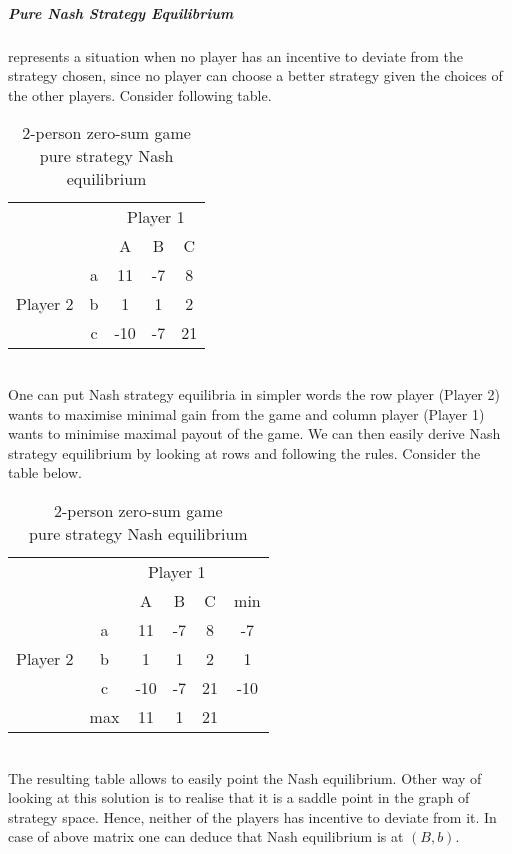\documentclass[10pt, a4paper]{report}
\begin{document}
\subparagraph{Pure Nash Strategy Equilibrium} represents a situation when no player has an incentive to deviate from the strategy chosen, since no player can choose a better strategy given the choices of the other players. Consider following table.
\begin{table}[ht!]
	\hspace{-4em}
	\centering
	\begin{tabular}{ccccc|}
		& & \multicolumn{3}{c}{Player 1}                                  \\ \cline{3-5}
		& & A & B & \multicolumn{1}{c}{C}                                 \\ \cline{3-5}
		\multirow{3}{*}{Player 2} & \multicolumn{1}{|c|}{a} & 11 & -7 & 8 \\
		& \multicolumn{1}{|c|}{b} & 1 & 1 & 2                             \\
		& \multicolumn{1}{|c|}{c} & -10 & -7 & 21                         \\ \cline{3-5}
	\end{tabular}
	\caption{2-person zero-sum game\\ pure strategy Nash equilibrium}
\end{table}
\\
One can put Nash strategy equilibria in simpler words the row player (Player 2) wants to maximise minimal gain from the game and column player (Player 1) wants to minimise maximal payout of the game. We can then easily derive Nash strategy equilibrium by looking at rows and following the rules. Consider the table below.
\begin{table}[ht!]
	\hspace{-4em}
	\centering
	\begin{tabular}{ccccc|c}
		& & \multicolumn{3}{c}{Player 1} &                                     \\ \cline{3-5}
		& & A & B & \multicolumn{1}{c}{C} & min                                \\ \cline{3-5}
		\multirow{3}{*}{Player 2} & \multicolumn{1}{|c|}{a} & 11 & -7 & 8 & -7 \\
		& \multicolumn{1}{|c|}{b} & 1 & 1 & 2 & 1                              \\
		& \multicolumn{1}{|c|}{c} & -10 & -7 & 21 & -10                        \\ \cline{3-5}
		& max & 11 & 1 & \multicolumn{1}{c}{21} &
	\end{tabular}
	\caption{2-person zero-sum game\\ pure strategy Nash equilibrium}
\end{table}
\\
The resulting table allows to easily point the Nash equilibrium. Other way of looking at this solution is to realise that it is a saddle point in the graph of strategy space. Hence, neither of the players has incentive to deviate from it. In case of above matrix one can deduce that Nash equilibrium is at $(B,b)$.
\end{document}
